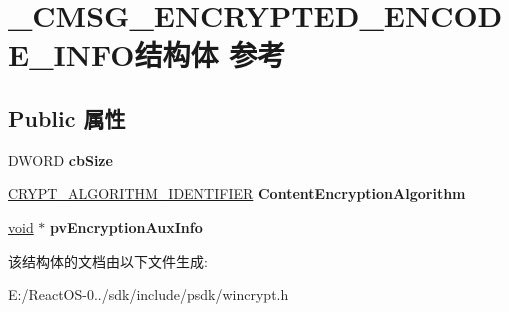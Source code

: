 \hypertarget{struct___c_m_s_g___e_n_c_r_y_p_t_e_d___e_n_c_o_d_e___i_n_f_o}{}\section{\+\_\+\+C\+M\+S\+G\+\_\+\+E\+N\+C\+R\+Y\+P\+T\+E\+D\+\_\+\+E\+N\+C\+O\+D\+E\+\_\+\+I\+N\+F\+O结构体 参考}
\label{struct___c_m_s_g___e_n_c_r_y_p_t_e_d___e_n_c_o_d_e___i_n_f_o}
\subsection*{Public 属性}
\begin{DoxyCompactItemize}
\item 
\mbox{\label{struct___c_m_s_g___e_n_c_r_y_p_t_e_d___e_n_c_o_d_e___i_n_f_o_a421f8f333c063b27290abfc9da00402f}} 
D\+W\+O\+RD {\bfseries cb\+Size}
\item 
\mbox{\label{struct___c_m_s_g___e_n_c_r_y_p_t_e_d___e_n_c_o_d_e___i_n_f_o_a18593952cd524d6700be588458692761}} 
\hyperlink{struct___c_r_y_p_t___a_l_g_o_r_i_t_h_m___i_d_e_n_t_i_f_i_e_r}{C\+R\+Y\+P\+T\+\_\+\+A\+L\+G\+O\+R\+I\+T\+H\+M\+\_\+\+I\+D\+E\+N\+T\+I\+F\+I\+ER} {\bfseries Content\+Encryption\+Algorithm}
\item 
\mbox{\label{struct___c_m_s_g___e_n_c_r_y_p_t_e_d___e_n_c_o_d_e___i_n_f_o_a19d49c32625540996e513811c46d2e42}} 
\hyperlink{interfacevoid}{void} $\ast$ {\bfseries pv\+Encryption\+Aux\+Info}
\end{DoxyCompactItemize}


该结构体的文档由以下文件生成\+:\begin{DoxyCompactItemize}
\item 
E\+:/\+React\+O\+S-\/0../sdk/include/psdk/wincrypt.\+h\end{DoxyCompactItemize}
